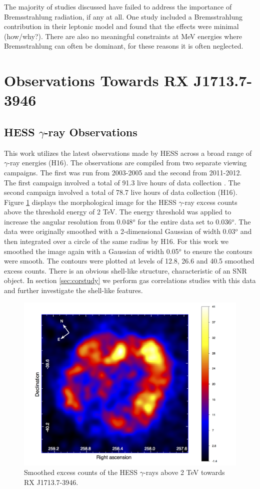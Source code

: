 \documentclass[12pt,a4paper]{article}
\begin{document}
The majority of studies discussed have failed to address the importance of Bremsstrahlung radiation, if any at all. One study included a Bremsstrahlung contribution in their leptonic model and found that the effects were minimal \citep{2012ApJ...751...65F} (how/why?). There are also no meaningful constraints at MeV energies where Bremsstrahlung can often be dominant, for these reasons it is often neglected.



\newpage
\section{Observations Towards RX J1713.7-3946} \label{sec:obvs}
\subsection{HESS $\gamma$-ray Observations}
This work utilizes the latest observations made by HESS across a broad range of $\gamma$-ray energies (H16). The observations are compiled from two separate viewing campaigns. The first was run from 2003-2005 and the second from 2011-2012. The first campaign involved a total of 91.3 live hours of data collection \citep{2007A&A...464..235A}. The second campaign involved a total of 78.7 live hours of data collection (H16). Figure \ref{fig:hessmap} displays the morphological image for the HESS $\gamma$-ray excess counts above the threshold energy of 2 TeV. The energy threshold was applied to increase the angular resolution from 0.048$^o$ for the entire data set to 0.036$^o$. The data were originally smoothed with a 2-dimensional Gaussian of width 0.03$^o$ and then integrated over a circle of the same radius by H16. For this work we smoothed the image again with a Gaussian of width 0.05$^o$ to ensure the contours were smooth. The contours were plotted at levels of 12.8, 26.6 and 40.5 smoothed excess counts. There is an obvious shell-like structure, characteristic of an SNR object. In section \ref{sec:corstudy} we perform gas correlations studies with this data and further investigate the shell-like features.
\begin{figure}[H]
	\centering
	\includegraphics[width=0.74\linewidth, height=0.35\textheight]{hess_map}
	\caption{Smoothed excess counts of the HESS $\gamma$-rays above 2 TeV towards RX J1713.7-3946.}
	\label{fig:hessmap}
\end{figure}
\end{document}
